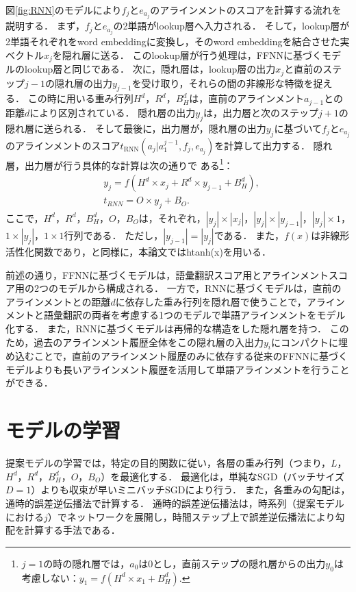 \documentclass[japanese]{jnlp_1.4}
\begin{document}
図\ref{fig:RNN}のモデルにより$f_{j}$と$e_{a_{j}}$のアラインメントのスコアを計算する流れを説明する．
まず，$f_{j}$と$e_{a_{j}}$の2単語がlookup層へ入力される．
そして，lookup層が2単語それぞれをword embeddingに変換し，そのword embeddingを結合させた実ベクトル$x_{j}$を隠れ層に送る．
このlookup層が行う処理は，FFNNに基づくモデルのlookup層と同じである．
次に，隠れ層は，lookup層の出力$x_{j}$と直前のステップ$j-1$の隠れ層の出力$y_{j-1}$を受け取り，それらの間の非線形な特徴を捉える．
この時に用いる重み行列$H^{d}$，$R^{d}$，$B_{H}^{d}$は，直前のアラインメント$a_{j-1}$との距離$d$により区別されている．
隠れ層の出力$y_{j}$は，出力層と次のステップ$j+1$の隠れ層に送られる．
そして最後に，出力層が，隠れ層の出力$y_{j}$に基づいて$f_{j}$と$e_{a_{j}}$のアラインメントのスコア$t_\mathrm{RNN}(a_{j}|a_{1}^{j-1},f_{j},e_{a_{j}})$を計算して出力する．
隠れ層，出力層が行う具体的な計算は次の通りで
\linebreak
ある\footnote{$j=1$の時の隠れ層では，$a_{0}$は0とし，直前ステップの隠れ層からの出力$y_{0}$は考慮しない：$y_{1}=f(H^{d} \times x_{1} + B^{d}_{H}).$}：
\begin{align}
\label{eqn:RNN2}
& y_{j}=f(H^{d} \times x_{j} + R^{d} \times y_{j-1} + B^{d}_{H}),\\
& t_\mathit{RNN}=O \times y_{j} + B_{O}.
\end{align}
ここで，$H^{d}$，$R^{d}$，$B^{d}_{H}$，$O$，$B_{O}$は，それぞれ，$|y_{j}| \times |x_{j}|$，$|y_{j}| \times |y_{j-1}|$，$|y_{j}| \times 1$，$1 \times |y_{j}|$，$1 \times 1$行列である．
ただし，$|y_{j-1}| = |y_{j}|$である．
また，$f(x)$は非線形活性化関数であり，\cite{yang13}と同様に，本論文ではhtanh(x)を用いる．

前述の通り，FFNNに基づくモデルは，語彙翻訳スコア用とアラインメントスコア用の2つのモデルから構成される．
一方で，RNNに基づくモデルは，直前のアラインメントとの距離$d$に依存した重み行列を隠れ層で使うことで，アラインメントと語彙翻訳の両者を考慮する1つのモデルで単語アラインメントをモデル化する．
また，RNNに基づくモデルは再帰的な構造をした隠れ層を持つ．
このため，過去のアラインメント履歴全体をこの隠れ層の入出力$y_{i}$にコンパクトに埋め込むことで，直前のアラインメント履歴のみに依存する従来のFFNNに基づくモデルよりも長いアラインメント履歴を活用して単語アラインメントを行うことができる．


\section{モデルの学習}
\label{sect:learning}

提案モデルの学習では，特定の目的関数に従い，各層の重み行列（つまり，$L$，$H^{d}$，$R^{d}$，$B^{d}_{H}$，$O$，$B_{O}$）を最適化する．
最適化は，単純なSGD（バッチサイズ$D=1$）よりも収束が早いミニバッチSGDにより行う．
また，各重みの勾配は，通時的誤差逆伝播法\cite{rumelhart86}で計算する．
通時的誤差逆伝播法は，時系列（提案モデルにおける$j$）でネットワークを展開し，時間ステップ上で誤差逆伝播法により勾配を計算する手法である．
\end{document}
